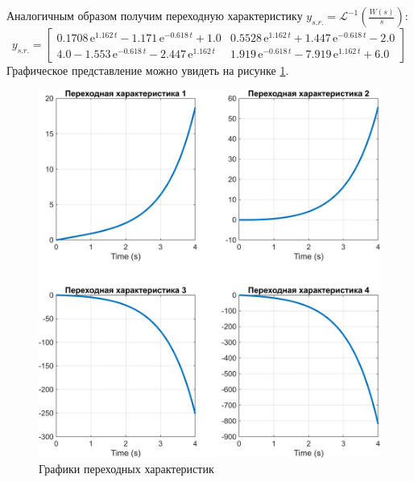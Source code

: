 \noindent Аналогичным образом получим переходную характеристику 
$y_{s.r.}=\mathcal{L}^{-1}\left( \frac{W(s)}{s} \right)$:
\begin{equation*}
    y_{s.r.}=\begin{bmatrix}
        0.1708\,{\mathrm{e}}^{1.162\,t} -1.171\,{\mathrm{e}}^{-0.618\,t} +1.0 &
        0.5528\,{\mathrm{e}}^{1.162\,t} +1.447\,{\mathrm{e}}^{-0.618\,t} -2.0 \\
        4.0-1.553\,{\mathrm{e}}^{-0.618\,t} -2.447\,{\mathrm{e}}^{1.162\,t} &
        1.919\,{\mathrm{e}}^{-0.618\,t} -7.919\,{\mathrm{e}}^{1.162\,t} +6.0
    \end{bmatrix}
\end{equation*}
Графическое представление можно увидеть на рисунке \ref{fig:1_sr}.
\begin{figure}[H]
    \centering
    \includegraphics[width=\linewidth]{figs/1_sr.png}
    \caption{Графики переходных характеристик}
    \label{fig:1_sr}
\end{figure}
